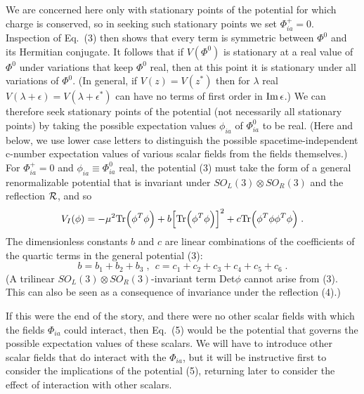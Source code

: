 We are concerned here only with stationary points of the potential for which charge is conserved, so in seeking such stationary points we set $\Phi_{ia}^+=0$.  Inspection of Eq.~(3) then shows that every term is symmetric between $\Phi^0$ and its Hermitian conjugate.  It follows that  if $V(\Phi^0)$ is stationary at a real value of $\Phi^0$ under variations that keep 
$\Phi^0$ real, then  at this point it is stationary under all variations of $\Phi^0$.  (In general, if $V(z)=V(z^*)$ then for $\lambda$ real   $V(\lambda+\epsilon)=V(\lambda+\epsilon^*)$ can have no terms of first order in ${\rm Im}\,\epsilon$.) 
We can therefore seek stationary points of the potential (not necessarily all stationary points) by taking the possible  expectation values $\phi_{ia}$ of $\Phi^0_{ia}$ to be real.  (Here and below, we use lower case letters to distinguish the possible spacetime-independent c-number expectation values of various scalar fields from the fields themselves.)
 For $\Phi^+_{ia}=0$ and $\phi_{ia}\equiv \Phi^0_{ia}$ real, the potential (3) must take the form of a  general renormalizable potential that is  invariant under $SO_L(3)\otimes  SO_R(3)$ and the reflection ${\cal R}$, and so 
\begin{equation}
V_I(\phi)=-\mu^2{\rm Tr}\Big(\phi^T\phi\Big)+b\Big[{\rm Tr}\Big(\phi^T\phi\Big)\Big]^2+c{\rm Tr}\Big(\phi^T\phi\phi^T\phi\Big)\;.
\end{equation}
The dimensionless constants $b$ and $c$ are linear combinations of the coefficients of the quartic terms in the general potential (3):  
\begin{equation}
 b=b_1+b_2+b_3\;,~~c=c_1+c_2+c_3+c_4+c_5+c_6 \;.
\end{equation}
(A trilinear  $SO_L(3)\otimes  SO_R(3)$-invariant term Det$\phi$ cannot arise from (3).  This can also be seen as a consequence of  invariance under the reflection (4).)


If this were the end of the story, and there were no other scalar fields with which the fields $\Phi_{ia}$ could interact, then Eq.~(5) would be the potential that governs the possible expectation values of these scalars.  We will have to introduce other scalar fields that do interact with the 
$\Phi_{ia}$, but it will be instructive first to consider the implications of the potential (5), returning later to consider the effect of interaction with other scalars.

